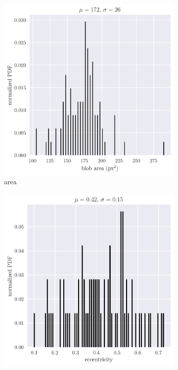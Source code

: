\documentclass[12pt,a4paper]{article}
\begin{document}
\begin{figure}[htb]
	\centering
	\begin{subfigure}[h!]{0.49\textwidth}
		\includegraphics[width=\textwidth]{area_hist.png}
		\caption{area}
		\label{fig:blob-area}
	\end{subfigure}
	\begin{subfigure}[h!]{0.49\textwidth}
		\includegraphics[width=\textwidth]{ecc_hist.png}

\end{subfigure}
\end{figure}
\end{document}
